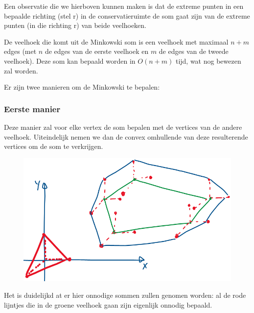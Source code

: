 \documentclass[12pt,a4paper]{article}
\begin{document}
	Een observatie die we hierboven kunnen maken is dat de extreme punten in een bepaalde richting (stel r) in de conservatieruimte de som gaat zijn van de extreme punten (in die richting r) van beide veelhoeken. 
	
	De veelhoek die komt uit de Minkowski som is een veelhoek met maximaal $n+m$ edges (met $n$ de edges van de eerste veelhoek en $m$ de edges van de tweede veelhoek). Deze som kan bepaald worden in $O(n+m)$ tijd, wat nog bewezen zal worden. 
	
	Er zijn twee manieren om de Minkowski te bepalen: 
	\subsubsection*{Eerste manier}
	Deze manier zal voor elke vertex de som bepalen met de vertices van de andere veelhoek. Uiteindelijk nemen we dan de convex omhullende van deze resulterende vertices om de som te verkrijgen. 
	\begin{figure}[H]
		\centering
		\includegraphics[width=0.7\linewidth]{afbeeldingen/Motion-plannine/eerste-manier-som}
		\label{fig:eerste-manier-som}
	\end{figure}
	Het is duidelijkd at er hier onnodige sommen zullen genomen worden: al de rode lijntjes die in de groene veelhoek gaan zijn eigenlijk onnodig bepaald. 
	
\end{document}
